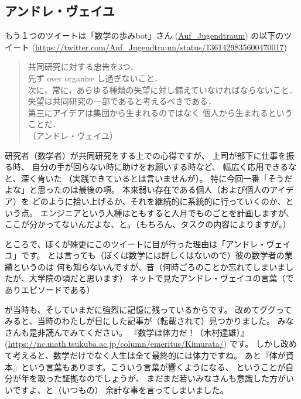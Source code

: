 \documentclass[dvipdfmx,autodetect-engine,10pt,b5paper,papersize,openany,dvipsnames]{jsbook}
\begin{document}
\begin{multicols}{2}
\subsection{アンドレ・ヴェイユ}
もう１つのツイートは「数学の歩みbot」さん
(\href{https://twitter.com/Auf_Jugendtraum}{Auf\_Jugendtraum})
の以下のツイート
(\url{https://twitter.com/Auf_Jugendtraum/status/1361429835600470017})
\begin{quotation}
  \noindent
  共同研究に対する忠告を3つ．\\
  先ず over organize し過ぎないこと．\\
  次に，常に，あらゆる種類の失望に対し備えていなければならないこと．\\
  失望は共同研究の一部であると考えるべきである．\\
  第三にアイデアは集団から生まれるのではなく 個人から生まれるということだ．\\
  （アンドレ・ヴェイユ）
\end{quotation}
研究者（数学者）が共同研究をする上での心得ですが、
上司が部下に仕事を振る時、
自分の手が回らない時に助けをお願いする時など、
幅広く応用できるなと、深く肯いた
（実践できているとは言いませんが）。
特に今回一番「そうだよな」と思ったのは最後の項。
本来弱い存在である個人（および個人のアイデア）を
どのように拾い上げるか、それを継続的に系統的に行っていくのか、という点。
エンジニアという人種はともすると人月でものごとを計画しますが、
ここが分かってないんだよな、と。（もちろん、タスクの内容によりますが。）


ところで、ぼくが殊更にこのツイートに目が行った理由は「アンドレ・ヴェイユ」です。
とは言っても（ぼくは数学には詳しくはないので）彼の数学者の業績というのは
何も知らないんですが、昔（何時ごろのことか忘れてしまいましたが、大学院の頃だと思います）
ネットで見たアンドレ・ヴェイユの言葉（でありエピソードである）
\begin{quotation}
\end{quotation}
が当時も、そしていまだに強烈に記憶に残っているからです。
改めてググってみると、当時のわたしが目にした記事が（転載されて）見つかりました。
みなさんも是非読んでみてください。
『数学は体力だ！（木村達雄）』
(\url{https://nc.math.tsukuba.ac.jp/column/emeritus/Kimurata/})
です。
しかし改めて考えると、数学だけでなく人生は全て最終的には体力ですね。
あと『体が資本』という言葉もあります。こういう言葉が響くようになる、
ということが自分が年を取った証拠なのでしょうが、
まだまだ若いみなさんも意識した方がいいですよ、と（いつもの）
余計な事を言ってしまいました。



\end{multicols}
\end{document}
